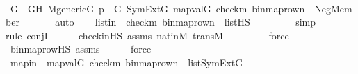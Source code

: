 \begin{isabellebody}
\ \ \isamarkupfalse%
\ \isamarkupfalse%
\ G\ \ GH{\isacharcolon}{\kern0pt}\ {\isachardoublequoteopen}M{\isacharunderscore}{\kern0pt}generic{\isacharparenleft}{\kern0pt}G{\isacharparenright}{\kern0pt}{\isachardoublequoteclose}\ {\isachardoublequoteopen}p\ {\isasymin}\ G{\isachardoublequoteclose}\ {\isachardoublequoteopen}{\isasymnot}{\isacharparenleft}{\kern0pt}SymExt{\isacharparenleft}{\kern0pt}G{\isacharparenright}{\kern0pt}{\isacharcomma}{\kern0pt}\ map{\isacharparenleft}{\kern0pt}val{\isacharparenleft}{\kern0pt}G{\isacharparenright}{\kern0pt}{\isacharcomma}{\kern0pt}\ {\isacharbrackleft}{\kern0pt}check{\isacharparenleft}{\kern0pt}m{\isacharparenright}{\kern0pt}{\isacharcomma}{\kern0pt}\ binmap{\isacharunderscore}{\kern0pt}row{\isacharprime}{\kern0pt}{\isacharparenleft}{\kern0pt}n{\isacharparenright}{\kern0pt}{\isacharbrackright}{\kern0pt}{\isacharparenright}{\kern0pt}\ {\isasymTurnstile}\ Neg{\isacharparenleft}{\kern0pt}Member{\isacharparenleft}{\kern0pt}{}{\isacharcomma}{\kern0pt}\ {}{\isacharparenright}{\kern0pt}{\isacharparenright}{\kern0pt}{\isacharparenright}{\kern0pt}{\isachardoublequoteclose}\isanewline
\ \ \ \ \isamarkupfalse%
\ auto\isanewline
\isanewline
\ \ \isamarkupfalse%
\ listin\ {\isacharcolon}{\kern0pt}\ {\isachardoublequoteopen}{\isacharbrackleft}{\kern0pt}check{\isacharparenleft}{\kern0pt}m{\isacharparenright}{\kern0pt}{\isacharcomma}{\kern0pt}\ binmap{\isacharunderscore}{\kern0pt}row{\isacharprime}{\kern0pt}{\isacharparenleft}{\kern0pt}n{\isacharparenright}{\kern0pt}{\isacharbrackright}{\kern0pt}\ {\isasymin}\ list{\isacharparenleft}{\kern0pt}HS{\isacharparenright}{\kern0pt}{\isachardoublequoteclose}\ \isanewline
\ \ \ \ \ \ \isamarkupfalse%
\ simp\isanewline
\ \ \ \ \ \ \isamarkupfalse%
{\isacharparenleft}{\kern0pt}rule\ conjI{\isacharparenright}{\kern0pt}\isanewline
\ \ \ \ \isamarkupfalse%
\ check{\isacharunderscore}{\kern0pt}in{\isacharunderscore}{\kern0pt}HS\ assms\ nat{\isacharunderscore}{\kern0pt}in{\isacharunderscore}{\kern0pt}M\ transM\isanewline
\ \ \ \ \ \ \ \isamarkupfalse%
\ force\isanewline
\ \ \ \ \isamarkupfalse%
\ binmap{\isacharunderscore}{\kern0pt}row{\isacharprime}{\kern0pt}{\isacharunderscore}{\kern0pt}HS\ assms\isanewline
\ \ \ \ \isamarkupfalse%
\ force\ \isanewline
\ \ \ \ \isamarkupfalse%
\isanewline
\isanewline
\ \ \isamarkupfalse%
\ mapin\ {\isacharcolon}{\kern0pt}\ {\isachardoublequoteopen}map{\isacharparenleft}{\kern0pt}val{\isacharparenleft}{\kern0pt}G{\isacharparenright}{\kern0pt}{\isacharcomma}{\kern0pt}\ {\isacharbrackleft}{\kern0pt}check{\isacharparenleft}{\kern0pt}m{\isacharparenright}{\kern0pt}{\isacharcomma}{\kern0pt}\ binmap{\isacharunderscore}{\kern0pt}row{\isacharprime}{\kern0pt}{\isacharparenleft}{\kern0pt}n{\isacharparenright}{\kern0pt}{\isacharbrackright}{\kern0pt}{\isacharparenright}{\kern0pt}\ {\isasymin}\ list{\isacharparenleft}{\kern0pt}SymExt{\isacharparenleft}{\kern0pt}G{\isacharparenright}{\kern0pt}{\isacharparenright}{\kern0pt}{\isachardoublequoteclose}\ \isanewline

\end{isabellebody}
